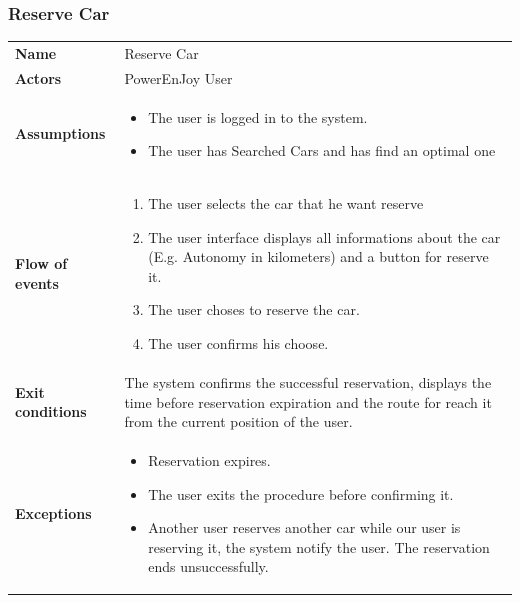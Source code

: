 \documentclass[english]{article}
\begin{document}
	\subsubsection{Reserve Car}
	\begin{center}
	\begin{tabular}{l||p{10cm}}
	\textbf{Name} 
		& Reserve Car\\ [8px]
	\textbf{Actors} 
		& PowerEnJoy User\\ [8px]
	\textbf{Assumptions} 
		& \begin{itemize}
			\item The user is logged in to the system.
			\item The user has Searched Cars and has find an optimal one
		\end{itemize}\\
	\textbf{Flow of events}
		& \begin{enumerate}
 			\item The user selects the car that he want reserve
 			\item The user interface displays all informations about the car (E.g. Autonomy in kilometers) and a button for reserve it. 
			\item The user choses to reserve the car. 
			\item The user confirms his choose.
		\end{enumerate}\\ 
	\textbf{Exit conditions}
		&The system confirms the successful reservation, displays the time before reservation expiration and the route for reach it from the current position of the user.\\ [8px]
	\textbf{Exceptions}
		& \begin{itemize}
			\item Reservation expires.
			\item The user exits the procedure before confirming it.
			\item Another user reserves another car while our user is reserving it, the system notify the user. The reservation ends unsuccessfully.
		\end{itemize}
	\end{tabular}
	\end{center}
\end{document}
